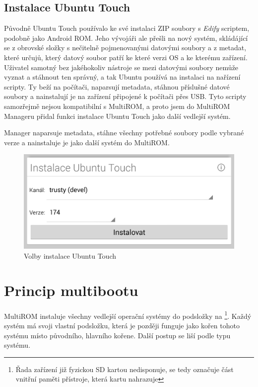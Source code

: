 \documentclass[12pt, a4paper, oneside]{article}
\newcommand{\It}{\textit}  %
\begin{document}
\subsection{Instalace Ubuntu Touch}
Původně Ubuntu Touch používalo ke své instalaci ZIP soubory s \It{Edify} scriptem, podobně jako Android ROM. Jeho vývojáři ale přešli na nový systém, skládájící se z obrovské složky s nečitelně pojmenovanými datovými soubory a z metadat, které určujů, který datový soubor patří ke které verzi OS a ke kterému zařízení. Uživatel samotný bez jakéhokoliv nástroje se mezi datovými soubory nemůže vyznat a stáhnout ten správný, a tak Ubuntu používá na instalaci na nařízení scripty. Ty beží na počítači, naparsují metadata, stáhnou příslušné datové soubory a nainstalují je na zařízení připojené k počítači přes USB. Tyto scripty samozřejmě nejsou kompatibilní s MultiROM, a proto jsem do MultiROM Manageru přidal funkci instalace Ubuntu Touch jako další vedlejší systém.

Manager naparsuje metadata, stáhne všechny potřebné soubory podle vybrané verze a nainstaluje je jako další systém do MultiROM.

\begin{figure}[H]
\begin{center}
 \includegraphics[width=\textwidth]{img/mgr_ubuntu.png}
\caption{Volby instalace Ubuntu Touch}
\end{center}
\end{figure}


\section {Princip multibootu}
\label{princip-multibootu}
MultiROM instaluje všechny vedlejší operační systémy do podsložky na \footnote{Řada zařízení již fyzickou SD kartou nedisponuje,  se tedy označuje část vnitřní paměti přístroje, která kartu nahrazuje}. Každý systém má svoji vlastní podsložku, která je později funguje jako kořen tohoto systému místo původního, hlavního kořene. Další postup se liší podle typu systému.
\end{document}
